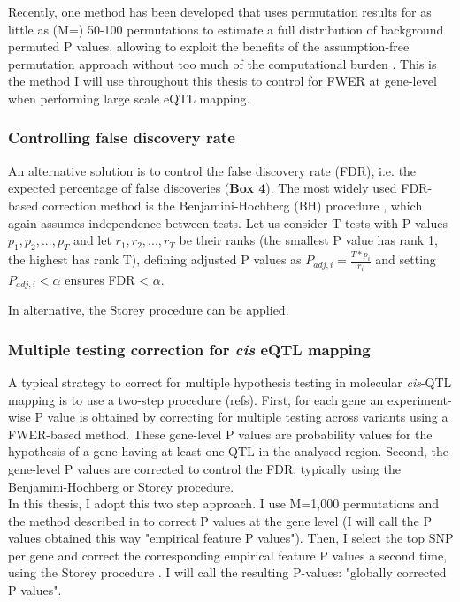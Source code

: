 Recently, one method has been developed that uses permutation results for as little as (M=) 50-100 permutations to estimate a full distribution of background permuted P values, allowing to exploit the benefits of the assumption-free permutation approach without too much of the computational burden \cite{ongen2016fast}. 
This is the method I will use throughout this thesis to control for FWER at gene-level when performing large scale eQTL mapping.

\subsubsection{Controlling false discovery rate}

An alternative solution is to control the false discovery rate (FDR), i.e. the expected percentage of false discoveries (\textbf{Box 4}).
The most widely used FDR-based correction method is the Benjamini-Hochberg (BH) procedure \cite{benjamini1995controlling}, which again assumes independence between tests. 
Let us consider T tests with P values $p_1, p_2, ..., p_T$ and let $r_1, r_2, ..., r_T$ be their ranks (the smallest P value has rank 1, the highest has rank T), defining adjusted P values as $P_{adj,i} = \frac{T*p_i}{r_i} $ and setting $P_{adj,i} <\alpha$ ensures FDR < $\alpha$.

In alternative, the Storey procedure \cite{storey2002direct}
can be applied.

\subsubsection{Multiple testing correction for \textit{cis} eQTL mapping}

A typical strategy to correct for multiple hypothesis testing in molecular \textit{cis}-QTL mapping is to use a two-step procedure \cite{gtex2015genotype} (refs). 
First, for each gene an experiment-wise P value is obtained by correcting for multiple testing across variants using a FWER-based method. 
These gene-level P values are probability values for the hypothesis of a gene having at least
one QTL in the analysed region. 
Second, the gene-level P values are corrected to control the FDR, typically using the Benjamini-Hochberg or Storey procedure.\\

In this thesis, I adopt this two step approach.
I use M=1,000 permutations and the method described in \cite{ongen2016fast} to correct P values at the gene level (I will call the P values obtained this way "empirical feature P values").
Then, I select the top SNP per gene and correct the corresponding empirical feature P values a second time, using the Storey procedure \cite{storey2002direct}.
I will call the resulting P-values: "globally corrected P values".

